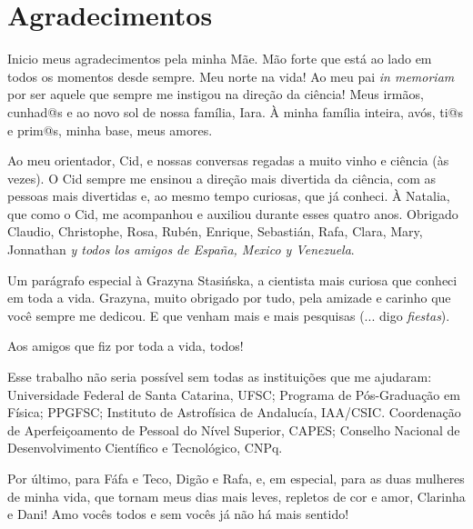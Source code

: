 


\chapter*{Agradecimentos}

Inicio meus agradecimentos pela minha Mãe. Mão forte que está ao lado em todos os momentos desde sempre. Meu norte na vida! Ao meu pai {\em in memoriam} por ser aquele que sempre me instigou na direção da ciência! Meus irmãos, cunhad@s e ao novo sol de nossa família, Iara. À minha família inteira, avós, ti@s e prim@s, minha base, meus amores.

Ao meu orientador, Cid, e nossas conversas regadas a muito vinho e ciência (às vezes). O Cid sempre me ensinou a direção mais divertida da ciência, com as pessoas mais divertidas e, ao mesmo tempo curiosas, que já conheci. À Natalia, que como o Cid, me acompanhou e auxiliou durante esses quatro anos. Obrigado Claudio, Christophe, Rosa, Rubén, Enrique, Sebastián, Rafa, Clara, Mary, Jonnathan {\em y todos los amigos de España, Mexico y Venezuela}.

Um parágrafo especial à Grazyna Stasi{\' n}ska, a cientista mais curiosa que conheci em toda a vida. Grazyna, muito obrigado por tudo, pela amizade e carinho que você sempre me dedicou. E que venham mais e mais pesquisas (... digo {\em fiestas}).

Aos amigos que fiz por toda a vida, todos!

Esse trabalho não seria possível sem todas as instituições que me ajudaram: Universidade Federal de Santa Catarina, UFSC; Programa de Pós-Graduação em Física; PPGFSC; Instituto de Astrofísica de Andalucía, IAA/CSIC. Coordenação de Aperfeiçoamento de Pessoal do Nível Superior, CAPES; Conselho Nacional de Desenvolvimento Científico e Tecnológico, CNPq.

Por último, para Fáfa e Teco, Digão e Rafa, e, em especial, para as duas mulheres de minha vida, que tornam meus dias mais leves, repletos de cor e amor, Clarinha e Dani! Amo vocês todos e sem vocês já não há mais sentido!

